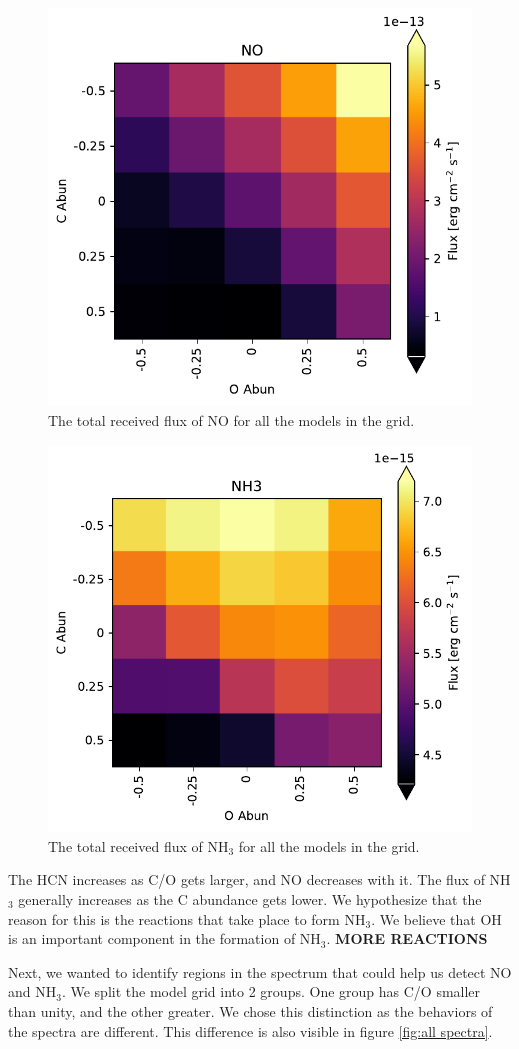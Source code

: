 \documentclass[twoside, single, authoryear, semicolon]{lion-msc}
\newcommand{\4}{$_4$}
\newcommand{\3}{$_3$}
\newcommand{\2}{$_2$}
\begin{document}
\begin{figure}[!ht]
    \centering
    \includegraphics[width=0.5\linewidth]{Figures/NO_heatmap.pdf}
    \caption{The total received flux of NO for all the models in the grid.}
    \label{fig:flux NO}
\end{figure}
\begin{figure}[!ht]
    \centering
    \includegraphics[width=0.5\linewidth]{Figures/NH3_heatmap.pdf}
    \caption{The total received flux of NH\3 for all the models in the grid.}
    \label{fig:flux NH3}
\end{figure}

The HCN increases as C/O gets larger, and NO decreases with it. The flux of NH\3 generally increases as the C abundance gets lower. We hypothesize that the reason for this is the reactions that take place to form NH\3.
We believe that OH is an important component in the formation of NH\3. 
\textbf{MORE REACTIONS}

Next, we wanted to identify regions in the spectrum that could help us detect NO and NH\3. We split the model grid into 2 groups. One group has C/O smaller than unity, and the other greater. We chose this distinction as the behaviors of the spectra are different. This difference is also visible in figure \ref{fig:all spectra}. 
\end{document}
